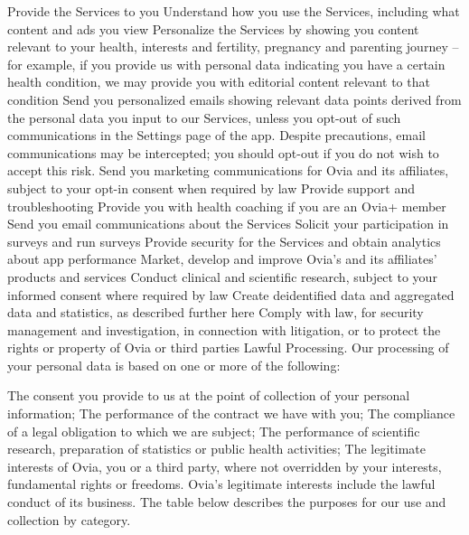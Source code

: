 Provide the Services to you
Understand how you use the Services, including what content and ads you view
Personalize the Services by showing you content relevant to your health, interests and fertility, pregnancy and parenting journey – for example, if you provide us with personal data indicating you have a certain health condition, we may provide you with editorial content relevant to that condition
Send you personalized emails showing relevant data points derived from the personal data you input to our Services, unless you opt-out of such communications in the Settings page of the app. Despite precautions, email communications may be intercepted; you should opt-out if you do not wish to accept this risk.
Send you marketing communications for Ovia and its affiliates, subject to your opt-in consent when required by law
Provide support and troubleshooting
Provide you with health coaching if you are an Ovia+ member
Send you email communications about the Services
Solicit your participation in surveys and run surveys
Provide security for the Services and obtain analytics about app performance
Market, develop and improve Ovia’s and its affiliates’ products and services
Conduct clinical and scientific research, subject to your informed consent where required by law
Create deidentified data and aggregated data and statistics, as described further here
Comply with law, for security management and investigation, in connection with litigation, or to protect the rights or property of Ovia or third parties
Lawful Processing. Our processing of your personal data is based on one or more of the following:

The consent you provide to us at the point of collection of your personal information;
The performance of the contract we have with you;
The compliance of a legal obligation to which we are subject;
The performance of scientific research, preparation of statistics or public health activities;
The legitimate interests of Ovia, you or a third party, where not overridden by your interests, fundamental rights or freedoms. Ovia’s legitimate interests include the lawful conduct of its business.
The table below describes the purposes for our use and collection by category.

